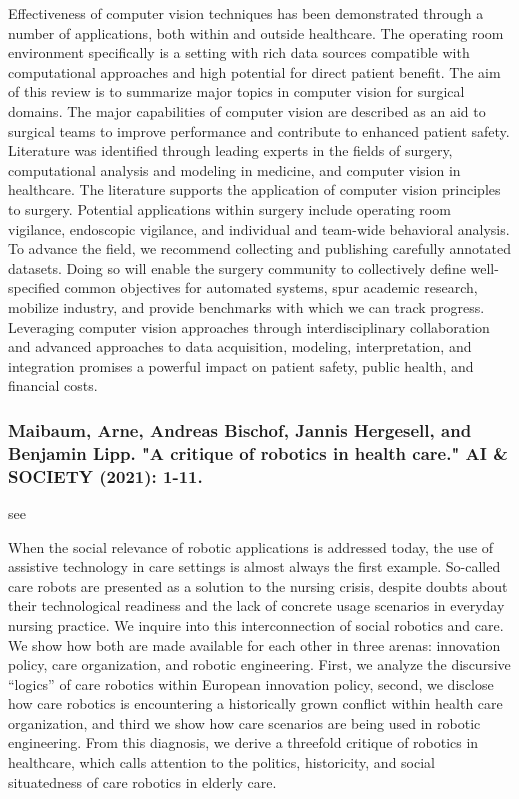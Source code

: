 \documentclass[conference]{IEEEtran}
\begin{document}
Effectiveness of computer vision techniques has been demonstrated through a number of applications, both within and outside healthcare. The operating room environment specifically is a setting with rich data sources compatible with computational approaches and high potential for direct patient benefit. The aim of this review is to summarize major topics in computer vision for surgical domains. The major capabilities of computer vision are described as an aid to surgical teams to improve performance and contribute to enhanced patient safety. Literature was identified through leading experts in the fields of surgery, computational analysis and modeling in medicine, and computer vision in healthcare. The literature supports the application of computer vision principles to surgery. Potential applications within surgery include operating room vigilance, endoscopic vigilance, and individual and team-wide behavioral analysis. To advance the field, we recommend collecting and publishing carefully annotated datasets. Doing so will enable the surgery community to collectively define well-specified common objectives for automated systems, spur academic research, mobilize industry, and provide benchmarks with which we can track progress. Leveraging computer vision approaches through interdisciplinary collaboration and advanced approaches to data acquisition, modeling, interpretation, and integration promises a powerful impact on patient safety, public health, and financial costs.

\medskip
\subsubsection{Maibaum, Arne, Andreas Bischof, Jannis Hergesell, and Benjamin Lipp. "A critique of robotics in health care." AI \& SOCIETY (2021): 1-11.}
see \cite{maibaum2021critique}

When the social relevance of robotic applications is addressed today, the use of assistive technology in care settings is almost always the first example. So-called care robots are presented as a solution to the nursing crisis, despite doubts about their technological readiness and the lack of concrete usage scenarios in everyday nursing practice. We inquire into this interconnection of social robotics and care. We show how both are made available for each other in three arenas: innovation policy, care organization, and robotic engineering. First, we analyze the discursive “logics” of care robotics within European innovation policy, second, we disclose how care robotics is encountering a historically grown conflict within health care organization, and third we show how care scenarios are being used in robotic engineering. From this diagnosis, we derive a threefold critique of robotics in healthcare, which calls attention to the politics, historicity, and social situatedness of care robotics in elderly care.
\end{document}
